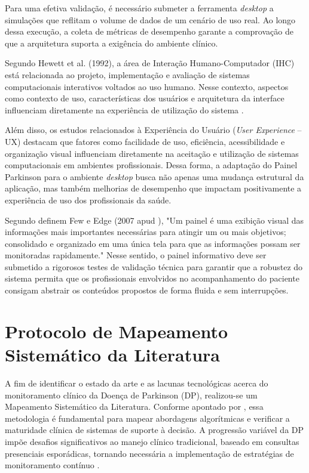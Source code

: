 Para uma efetiva validação, é necessário submeter a ferramenta \textit{desktop} a simulações que reflitam o volume de dados de um cenário de uso real. Ao longo dessa execução, a coleta de métricas de desempenho garante a comprovação de que a arquitetura suporta a exigência do ambiente clínico.

Segundo Hewett et al. (1992), a área de Interação Humano-Computador (IHC) está relacionada ao projeto, implementação e avaliação de sistemas computacionais interativos voltados ao uso humano. Nesse contexto, aspectos como contexto de uso, características dos usuários e arquitetura da interface influenciam diretamente na experiência de utilização do sistema \cite{ihc2022}.

Além disso, os estudos relacionados à Experiência do Usuário (\textit{User Experience} -- UX) destacam que fatores como facilidade de uso, eficiência, acessibilidade e organização visual influenciam diretamente na aceitação e utilização de sistemas computacionais em ambientes profissionais. Dessa forma, a adaptação do Painel Parkinson para o ambiente \textit{desktop} busca não apenas uma mudança estrutural da aplicação, mas também melhorias de desempenho que impactam positivamente a experiência de uso dos profissionais da saúde.

Segundo definem Few e Edge (2007 apud ), "Um painel é uma exibição visual das informações mais importantes necessárias para atingir um ou mais objetivos; consolidado e organizado em uma única tela para que as informações possam ser monitoradas rapidamente." Nesse sentido, o painel informativo deve ser submetido a rigorosos testes de validação técnica para garantir que a robustez do sistema permita que os profissionais envolvidos no acompanhamento do paciente consigam abstrair os conteúdos propostos de forma fluida e sem interrupções.

\section{Protocolo de Mapeamento Sistemático da Literatura}
\label{sec:ProtocoloSistematico}

A fim de identificar o estado da arte e as lacunas tecnológicas acerca do monitoramento clínico da Doença de Parkinson (DP), realizou-se um Mapeamento Sistemático da Literatura. Conforme apontado por , essa metodologia é fundamental para mapear abordagens algorítmicas e verificar a maturidade clínica de sistemas de suporte à decisão. A progressão variável da DP impõe desafios significativos ao manejo clínico tradicional, baseado em consultas presenciais esporádicas, tornando necessária a implementação de estratégias de monitoramento contínuo .

